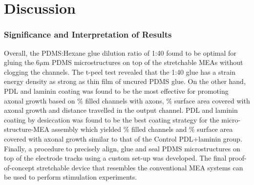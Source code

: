 \chapter{Discussion}
\label{ch:Discussion}


 
\subsection{Significance and Interpretation of Results}

\quad Overall, the PDMS:Hexane glue dilution ratio of 1:40 found to be optimal for gluing the 6$\mu$m PDMS microstructures on top of the stretchable MEAs without clogging the channels. The t-peel test revealed that the 1:40 glue has a strain energy density as strong as thin film of uncured PDMS glue. On the other hand, PDL and laminin coating was found to be the most effective for promoting axonal growth based on $\%$ filled channels with axons, $\%$ surface area covered with axonal growth and distance travelled in the output channel. PDL and laminin coating by desiccation was found to be the best coating strategy for the micro-structure-MEA assembly which yielded $\%$ filled channels and $\%$ surface area covered with axonal growth similar to that of the Control PDL+laminin group. Finally, a procedure to precisely align, glue and seal PDMS microstructures on top of the electrode tracks using a custom set-up was developed. The final proof-of-concept stretchable device that resembles the conventional MEA systems can be used to perform stimulation experiments. 

